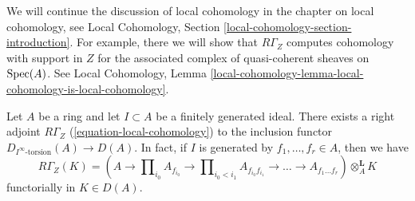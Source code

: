 \medskip\noindent
We will continue the discussion of local cohomology in
the chapter on local cohomology, see
Local Cohomology, Section \ref{local-cohomology-section-introduction}.
For example, there we will show that $R\Gamma_Z$ computes cohomology
with support in $Z$ for the associated complex of quasi-coherent sheaves
on $\mathop{\mathrm{Spec}}(A)$. See Local Cohomology, Lemma
\ref{local-cohomology-lemma-local-cohomology-is-local-cohomology}.


\begin{lemma}
\label{lemma-local-cohomology-adjoint}
Let $A$ be a ring and let $I \subset A$ be a finitely generated ideal.
There exists a right adjoint $R\Gamma_Z$ (\ref{equation-local-cohomology})
to the inclusion functor $D_{I^\infty\text{-torsion}}(A) \to D(A)$.
In fact, if $I$ is generated by $f_1, \ldots, f_r \in A$, then we have
$$
R\Gamma_Z(K) =
(A \to \prod\nolimits_{i_0} A_{f_{i_0}} \to
\prod\nolimits_{i_0 < i_1} A_{f_{i_0}f_{i_1}}
\to \ldots \to A_{f_1\ldots f_r}) \otimes_A^\mathbf{L} K
$$
functorially in $K \in D(A)$.
\end{lemma}

